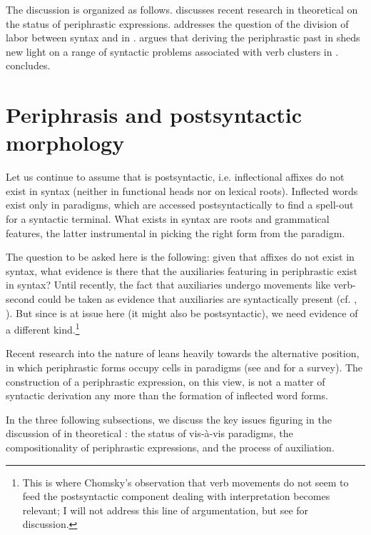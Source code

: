 \documentclass[output=paper]{LSP/langsci}
\begin{document}
\newpage The discussion is organized as follows.  discusses recent research in theoretical  on the status of periphrastic expressions.  addresses the question of the division of labor between syntax and  in .  argues that deriving the periphrastic past in  sheds new light on a range of syntactic problems associated with verb clusters in .  concludes.

\section{Periphrasis and postsyntactic morphology}\label{sec:zwart:2} 

Let us continue to assume that  is postsyntactic, i.e. inflectional affixes do not exist in syntax (neither in functional heads nor on lexical roots). Inflected words exist only in  paradigms, which are accessed postsyntactically to find a spell-out for a syntactic terminal. What exists in syntax are roots and grammatical features, the latter instrumental in picking the right form from the paradigm.

The question to be asked here is the following: given that affixes do not exist in syntax, what evidence is there that the auxiliaries featuring in periphrastic  exist in syntax? Until recently, the fact that auxiliaries undergo movements like verb-second could be taken as evidence that auxiliaries are syntactically present (cf. \citealt[203]{Embick2000}, \citealt[132]{Kiparsky2005}). But since  is at issue here (it might also be postsyntactic), we need evidence of a different kind.\footnote{This is where Chomsky’s observation that verb movements do not seem to feed the postsyntactic component dealing with interpretation becomes relevant; I will not address this line of argumentation, but see \citet{Holmberg2015verbsecond} for discussion.}

Recent research into the nature of  leans heavily towards the alternative position, in which periphrastic forms occupy cells in  paradigms (see \citealt{Chumakina2013} and \citealt{SpencerPopova2015} for a survey). The construction of a periphrastic expression, on this view, is not a matter of syntactic derivation any more than the formation of inflected word forms.

In the three following subsections, we discuss the key issues figuring in the discussion of  in theoretical : the status of  vis-à-vis  paradigms, the compositionality of periphrastic expressions, and the process of auxiliation.
\end{document}
